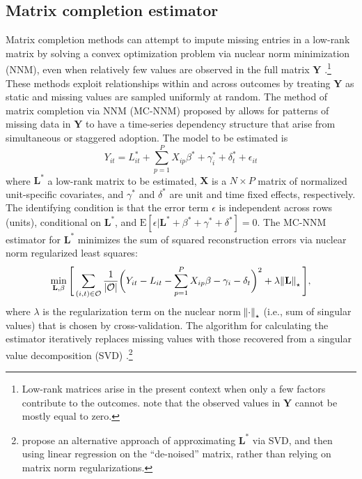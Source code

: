 \documentclass[12pt]{article}
\newcommand{\E}{\mathrm{E}}
\begin{document}
\subsection{Matrix completion estimator}

Matrix completion methods can attempt to impute missing entries in a low-rank matrix by solving a convex optimization problem via nuclear norm minimization (NNM), even when relatively few values are observed in the full matrix $\mathbf{Y}$ \citep[e.g.,][]{candes2009exact,candes2010matrix}.\footnote{Low-rank matrices arise in the present context when only a few factors contribute to the outcomes. \citet{candes2009exact} note that the observed values in $\mathbf{Y}$ cannot be mostly equal to zero.} These methods exploit relationships within and across outcomes by treating $\mathbf{Y}$ as static and missing values are sampled uniformly at random. The method of matrix completion via NNM (MC-NNM) proposed by \citet{athey2017matrix} allows for patterns of missing data in $\mathbf{Y}$ to have a time-series dependency structure that arise from simultaneous or staggered adoption. The model to be estimated is
%
\begin{equation}
Y_{it} = L_{it}^{*} + \sum_{p=1}^{P} X_{ip} \beta^{*} + \gamma_{i}^{*} + \delta_{t}^{*} + \epsilon_{it} \label{eq:mc-Y}
\end{equation}
%
where $\mathbf{L^{*}}$ a low-rank matrix to be estimated, $\mathbf{X}$ is a $N \times P$ matrix of normalized unit-specific covariates, and $\gamma^{*}$ and $\delta^{*}$ are unit and time fixed effects, respectively. The identifying condition is that the error term $\epsilon$ is independent across rows (units), conditional on $\mathbf{L^{*}}$, and $\E[\epsilon | \mathbf{L^{*}} + \beta^{*} + \gamma^{*} + \delta^{*}] = 0$. The MC-NNM estimator for $\mathbf{L^{*}}$ minimizes the sum of squared reconstruction errors via nuclear norm regularized least squares:
%
\begin{equation}
\min_{\mathbf{L}, \beta} \Bigg[\sum_{(i,t) \in \mathcal{O}} \frac{1}{|\mathcal{O}|} \bigg(Y_{it} - L_{it} - \sum_{p=1}^{P} X_{ip} \beta - \gamma_{i} - \delta_{t} \bigg)^2 + \lambda \norm{\mathbf{L}}_\star \Bigg], \label{eq:mc-opt}
\end{equation}
%
where $\lambda$ is the regularization term on the nuclear norm $\norm{\cdot}_\star$ (i.e., sum of singular values) that is chosen by cross-validation. The algorithm for calculating the estimator iteratively replaces missing values with those recovered from a singular value decomposition (SVD) \citep{mazumder2010spectral}.\footnote{\citet{amjad2018robust} propose an alternative approach of approximating $\mathbf{L^{*}}$ via SVD, and then using linear regression on the ``de-noised'' matrix, rather than relying on matrix norm regularizations.} 
\end{document}
